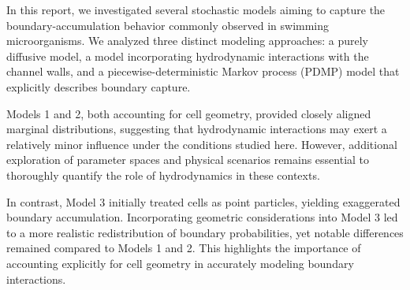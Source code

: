 In this report, we investigated several stochastic models aiming to capture the 
boundary-accumulation behavior commonly observed in swimming microorganisms. 
We analyzed three distinct modeling approaches: a purely diffusive model, a model incorporating hydrodynamic interactions with the channel walls, and a piecewise-deterministic Markov process (PDMP) model that explicitly describes boundary capture.

Models 1 and 2, both accounting for cell geometry, provided closely aligned marginal distributions, 
suggesting that hydrodynamic interactions may exert a relatively minor influence under the 
conditions studied here. However, additional exploration of parameter spaces and physical 
scenarios remains essential to thoroughly quantify the role of hydrodynamics in these contexts.

In contrast, Model 3 initially treated cells as point particles, 
yielding exaggerated boundary accumulation. Incorporating geometric considerations into Model 
3 led to a more realistic redistribution of boundary probabilities, yet notable differences 
remained compared to Models 1 and 2. This highlights the importance of accounting explicitly 
for cell geometry in accurately modeling boundary interactions.